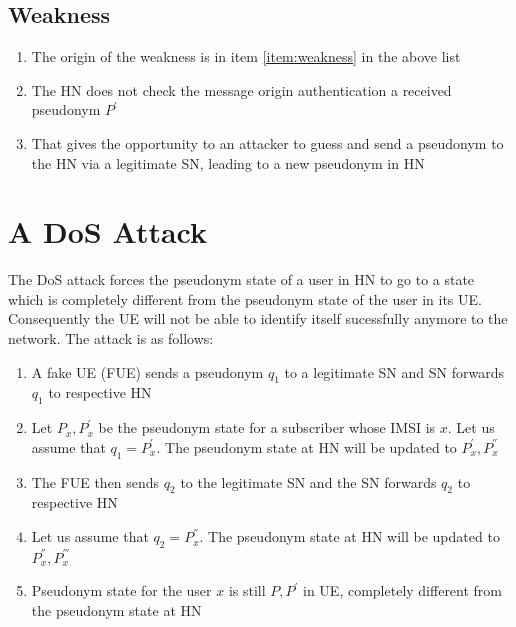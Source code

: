 \documentclass[portrait,a0]{a0poster}
\begin{document}
\begin{multicols}{2}
\subsection*{Weakness}
	\begin{enumerate}
		\item The origin of the weakness is in item \ref{item:weakness} in the above list
		\item The HN does not check the message origin authentication a received pseudonym $P^{'}$
		\item That gives the opportunity to an attacker to guess and send a pseudonym to the HN via a legitimate SN, leading to a new pseudonym in HN
	\end{enumerate}

\section{A D\MakeLowercase{o}S Attack}
The DoS attack forces the pseudonym state of a user in HN to go to a state which is completely different from the pseudonym state of the user in its UE. Consequently the UE will not be able to identify itself sucessfully anymore to the network. The attack is as follows:
\begin{enumerate}
\item \label{send_fake_pseudonym} A fake UE (FUE) sends a pseudonym $q_1$ to a legitimate SN and SN forwards $q_1$ to respective HN
\item \label{q_equal_pseudonym} Let $P_x,P_x^{'}$ be the pseudonym state for a subscriber whose IMSI is $x$. Let us assume that $q_1=P_x^{'}$. The pseudonym state at HN will be updated to $P_x^{'},P_x^{''}$
\item The FUE then sends $q_2$ to the legitimate SN and the SN forwards $q_2$ to respective HN
\item Let us assume that $q_2=P_x^{''}$. The pseudonym state at HN will be updated to $P_x^{''},P_x^{'''}$
\item Pseudonym state for the user $x$ is still $P,P^{'}$ in UE, completely different from the pseudonym state at HN
\end{enumerate}


\end{multicols}
\end{document}
